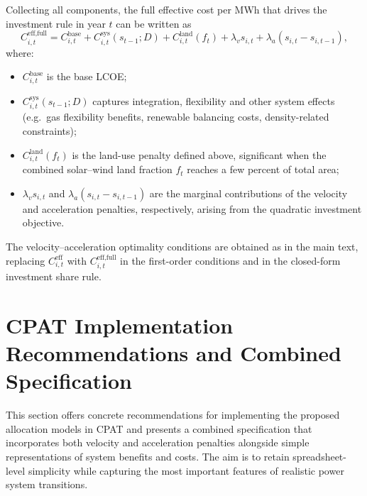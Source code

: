 \documentclass[preprint,authoryear,12pt]{elsarticle}
\begin{document}
\medskip

Collecting all components, the full effective cost per MWh that drives the investment rule in
year $t$ can be written as
\begin{equation}
    C_{i,t}^{\text{eff,full}}
    = C_{i,t}^{\text{base}}
      + C_{i,t}^{\text{sys}}(s_{t-1};D)
      + C_{i,t}^{\text{land}}(f_t)
      + \lambda_v s_{i,t}
      + \lambda_a (s_{i,t} - s_{i,t-1}),
    \label{eq:full_effective_cost_land}
\end{equation}
where:
\begin{itemize}
    \item $C_{i,t}^{\text{base}}$ is the base LCOE;
    \item $C_{i,t}^{\text{sys}}(s_{t-1};D)$ captures integration, flexibility and other system
          effects (e.g.\ gas flexibility benefits, renewable balancing costs, density-related
          constraints);
    \item $C_{i,t}^{\text{land}}(f_t)$ is the land-use penalty defined above, significant when
          the combined solar–wind land fraction $f_t$ reaches a few percent of total area;
    \item $\lambda_v s_{i,t}$ and $\lambda_a (s_{i,t} - s_{i,t-1})$ are the marginal contributions
          of the velocity and acceleration penalties, respectively, arising from the quadratic
          investment objective.
\end{itemize}

The velocity–acceleration optimality conditions are obtained as in the main text, replacing
$C_{i,t}^{\mathrm{eff}}$ with $C_{i,t}^{\text{eff,full}}$ in the first-order conditions and in the
closed-form investment share rule.

\medskip

\newpage
\section{CPAT Implementation Recommendations and Combined Specification}

This section offers concrete recommendations for implementing the proposed allocation models in
CPAT and presents a combined specification that incorporates both velocity and acceleration
penalties alongside simple representations of system benefits and costs. The aim is to retain
spreadsheet-level simplicity while capturing the most important features of realistic power system
transitions.
\end{document}
